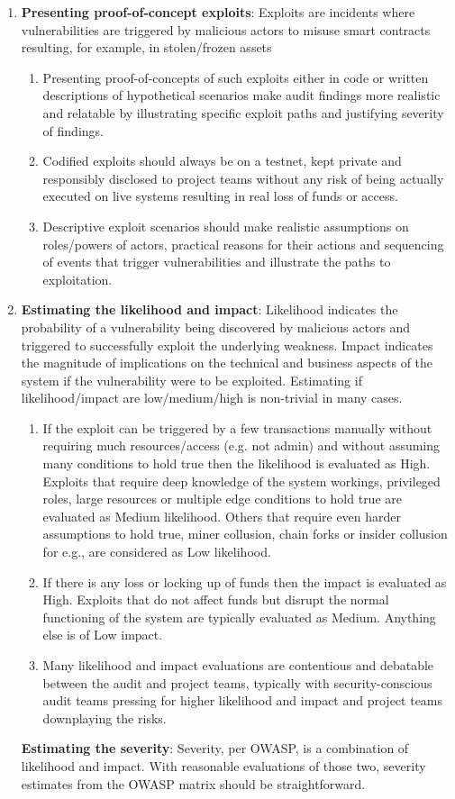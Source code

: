 \begin{enumerate}
\item\textbf{Presenting proof-of-concept exploits}: Exploits are incidents where vulnerabilities are triggered by malicious actors to misuse smart contracts resulting, for example, in stolen/frozen assets
	\begin{enumerate}
	\item Presenting proof-of-concepts of such exploits either in code or written descriptions of hypothetical scenarios make audit findings more realistic and relatable by illustrating specific exploit paths and justifying severity of findings.
	\item Codified exploits should always be on a testnet, kept private and responsibly disclosed to project teams without any risk of being actually executed on live systems resulting in real loss of funds or access.
	\item Descriptive exploit scenarios should make realistic assumptions on roles/powers of actors, practical reasons for their actions and sequencing of events that trigger vulnerabilities and illustrate the paths to exploitation.
	\end{enumerate}

\item\textbf{Estimating the likelihood and impact}: Likelihood indicates the probability of a vulnerability being discovered by malicious actors and triggered to successfully exploit the underlying weakness. Impact indicates the magnitude of implications on the technical and business aspects of the system if the vulnerability were to be exploited. Estimating if likelihood/impact are low/medium/high is non-trivial in many cases.
	\begin{enumerate}
	\item If the exploit can be triggered by a few transactions manually without requiring much resources/access (e.g. not admin) and without assuming many conditions to hold true then the likelihood is evaluated as High. Exploits that require deep knowledge of the system workings, privileged roles, large resources or multiple edge conditions to hold true are evaluated as Medium likelihood. Others that require even harder assumptions to hold true, miner collusion, chain forks or insider collusion for e.g., are considered as Low likelihood.
	\item If there is any loss or locking up of funds then the impact is evaluated as High. Exploits that do not affect funds but disrupt the normal functioning of the system are typically evaluated as Medium. Anything else is of Low impact.
	\item Many likelihood and impact evaluations are contentious and debatable between the audit and project teams, typically with security-conscious audit teams pressing for higher likelihood and impact and project teams downplaying the risks.
	\end{enumerate}
\textbf{Estimating the severity}: Severity, per OWASP, is a combination of likelihood and impact. With reasonable evaluations of those two, severity estimates from the OWASP matrix should be straightforward.


\end{enumerate}
